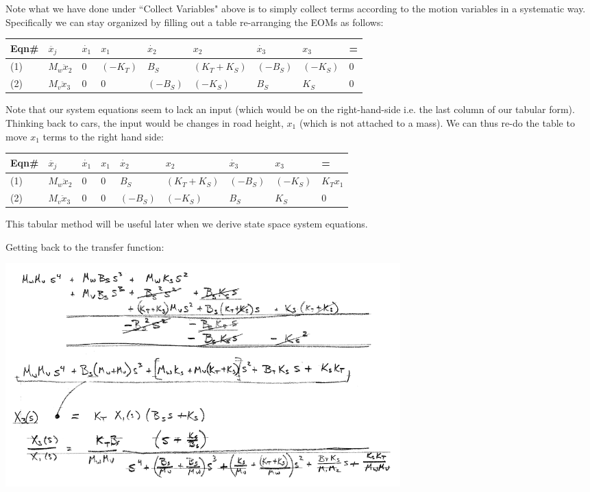 %
\begin{ExampleCont}
Note what we have done under ``Collect Variables" above is to simply collect terms according to the motion variables in a systematic
way.  Specifically we can stay organized by filling
out a table re-arranging the EOMs as follows:\vspace{0.3in}



\renewcommand\arraystretch{1.5}%


\begin{tabular}{|p{0.35in}|p{0.55in}|p{0.55in}|p{0.55in}|p{0.35in}|p{0.65in}|p{0.55in}|p{0.55in}|p{0.35in}|}\hline
  Eqn\# & $\ddot{x_j}$ & $\dot{x_1}$ & $x_1$  & $\dot{x_2}$ & ${x_2} $& $\dot{x_3}$ & ${x_3} $ &  = \\ \hline
  (1)   & $M_w\ddot{x}_2$ & 0 & $(-K_T)$ & $B_S$    & $(K_T+K_S)$ & $(-B_S)$ & $(-K_S)$ & 0  \\ \hline
  (2)   & $M_v\ddot{x}_3$ & 0 & 0        & $(-B_S)$ & $(-K_S)$    & $B_S$    & $K_S$    & 0 \\ \hline
\end{tabular}

Note that our system equations seem to lack an input (which would be on the right-hand-side i.e. the
last column of our tabular form).  Thinking back to cars, the input would be changes in road height,
$x_1$ (which is not attached to a mass).  We can thus re-do the table to move $x_1$ terms to
the right hand side:

\begin{tabular}{|p{0.35in}|p{0.55in}|p{0.55in}|p{0.55in}|p{0.35in}|p{0.65in}|p{0.55in}|p{0.55in}|p{0.35in}|}\hline
  Eqn\# & $\ddot{x_j}$ & $\dot{x_1}$ & $x_1$  & $\dot{x_2}$ & ${x_2} $& $\dot{x_3}$ & ${x_3} $ &  = \\ \hline
  (1)   & $M_w\ddot{x}_2$ & 0 & $0$ & $B_S$    & $(K_T+K_S)$ & $(-B_S)$ & $(-K_S)$ & $K_Tx_1$ \\ \hline
  (2)   & $M_v\ddot{x}_3$ & 0 & 0        & $(-B_S)$ & $(-K_S)$    & $B_S$    & $K_S$    & 0 \\ \hline
\end{tabular}

This tabular method will be useful later when we derive state space system equations.

Getting back to the transfer function:

\includegraphics[width=6.0in]{figs02/00961.png}


\end{ExampleCont}
